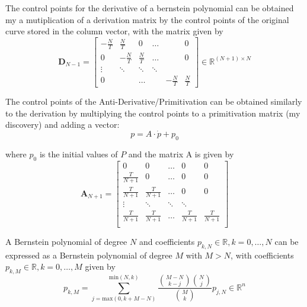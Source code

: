 \par The control points for the derivative of a bernstein polynomial can be obtained my a mutiplication of a derivation matrix by the control points of the original curve stored in the column vector, with the matrix given by 
\begin{equation}
    \boldsymbol{D}_{N-1} = 
    \begin{bmatrix}
        -\frac{N}{T} & \frac{N}{T} & 0 & \ldots & & 0 \\
        0 & -\frac{N}{T} & \frac{N}{T} & \ldots & & 0 \\
        \vdots &  \ddots & \ddots & \ddots & &   \\
        0 & & \ldots & & -\frac{N}{T} & \frac{N}{T}
    \end{bmatrix} \in \mathbb{R}^{(N+1)\times N}
    \label{eq:bernderivmat}
\end{equation}

\par The control points of the Anti-Derivative/Primitivation can be obtained similarly to the derivation by multiplying the control points to a primitivation matrix (my discovery) and adding a vector:
\begin{equation}
    p = A \cdot \dot{p}  + p_0
\end{equation}

where $p_0$ is the initial values of $P$ and the matrix A is given by 
\begin{equation}
    \boldsymbol{A}_{N+1} = \begin{bmatrix}
        0 & 0 & \ldots & 0 & 0 \\
        \frac{T}{N+1} & 0 & \ldots & 0 & 0 \\
        \frac{T}{N+1} & \frac{T}{N+1} & \ldots & 0 & 0 \\
        \vdots & \ddots & \ddots & \ddots & \\
        \frac{T}{N+1} & \frac{T}{N+1} & \ldots & \frac{T}{N+1} & \frac{T}{N+1} \\
    \end{bmatrix}
\end{equation}

\par A Bernstein polynomial of degree $N$ and coefficients $p_{k,N}\in \mathbb{R}, k = 0,\dots,N$ can be expressed as a Bernstein polynomial of degree $M$ with $M>N$, with coefficients $p_{k,M} \in \mathbb{R}, k = 0,\dots,M$ given by 
\begin{equation}
    p_{k,M} = \sum_{j=\text{max}(0,k+M-N)}^{\text{min}(N,k)} \frac{{M-N \choose k-j}{N\choose j}}{{M\choose k}} p_{j,N} \in \mathbb{R}^n
\end{equation}

